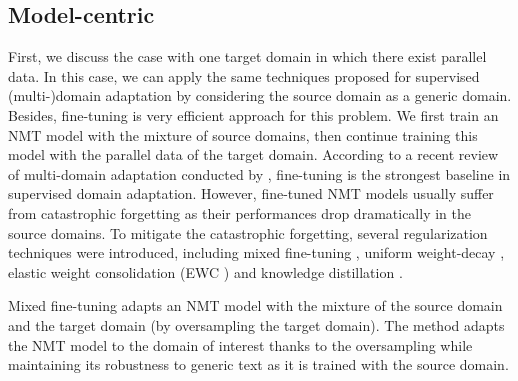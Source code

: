 \subsection{Model-centric}
First, we discuss the case with one target domain in which there exist parallel data. In this case, we can apply the same techniques proposed for supervised (multi-)domain adaptation by considering the source domain as a generic domain. Besides, fine-tuning is very efficient approach for this problem\citep{Luong15stanford,Miceli17regularization,Servan16Domain,Freitag16fast}. We first train an NMT model with the mixture of source domains, then continue training this model with the parallel data of the target domain. According to a recent review of multi-domain adaptation conducted by \citet{Pham20Priming}, fine-tuning is the strongest baseline in supervised domain adaptation. However, fine-tuned NMT models usually suffer from catastrophic forgetting \citep{Michael89catastrophic} as their performances drop dramatically in the source domains. To mitigate the catastrophic forgetting, several regularization techniques were introduced, including mixed fine-tuning \citep{Chu17empirical}, uniform weight-decay \citep{Miceli17regularization}, elastic weight consolidation (EWC ) \citep{Brian19overcoming, Kirk16overcoming, Saunders19domain} and knowledge distillation \citep{Dakwle17fine}. 

Mixed fine-tuning \citep{Chu17empirical} adapts an NMT model with the mixture of the source domain and the target domain (by oversampling the target domain). The method adapts the NMT model to the domain of interest thanks to the oversampling while maintaining its robustness to generic text as it is trained with the source domain.

